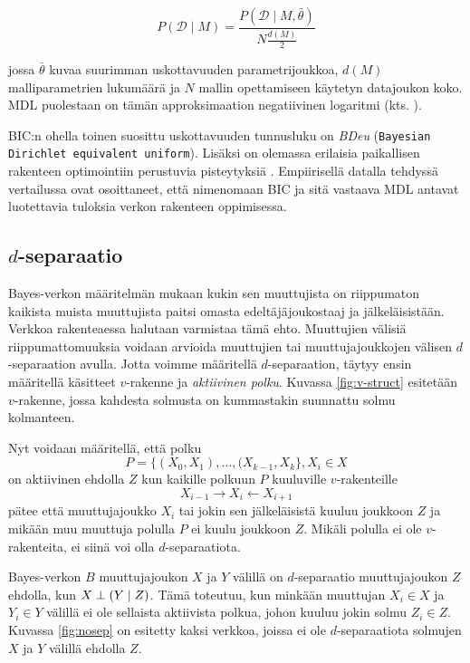$$
P(\mathcal{D} \mid M) = \frac{P(\mathcal{D}\mid M, \bar{\theta})}{N{\frac{d(M)}{2}}}
$$

jossa $\bar{\theta}$ kuvaa suurimman uskottavuuden parametrijoukkoa, $d(M)$ malliparametrien lukumäärä ja $N$ mallin opettamiseen käytetyn datajoukon koko. MDL puolestaan on tämän approksimaation negatiivinen logaritmi (kts. \citet{rissanen_stochastic_1987}).

BIC:n ohella toinen suosittu uskottavuuden tunnusluku on \emph{BDeu} (\texttt{Bayesian Dirichlet equivalent uniform}). Lisäksi on olemassa erilaisia paikallisen rakenteen optimointiin perustuvia pisteytyksiä \citep{scanagatta_survey_2019}.   Empiirisellä datalla tehdyssä vertailussa \citet{liu_empirical_2012} ovat osoittaneet, että nimenomaan BIC ja sitä vastaava MDL antavat luotettavia tuloksia verkon rakenteen oppimisessa.

\subsection{$d$-separaatio}\label{dsep}
Bayes-verkon määritelmän mukaan kukin sen muuttujista on riippumaton kaikista muista muuttujista paitsi omasta edeltäjäjoukostaaj ja jälkeläisistään. Verkkoa rakenteaessa halutaan varmistaa tämä ehto. Muuttujien välisiä riippumattomuuksia voidaan arvioida muuttujien tai muuttujajoukkojen välisen $d$-separaation \citep{koller_probabilistic_2009} avulla. Jotta voimme määritellä $d$-separaation, täytyy ensin määritellä käsitteet $v$-rakenne ja \emph{aktiivinen polku}. Kuvassa \ref{fig:v-struct} esitetään $v$-rakenne, jossa kahdesta solmusta on kummastakin suunnattu solmu kolmanteen.

\begin{center}
\end{center}

Nyt voidaan määritellä, että polku
$$
    P = \{(X_0, X_1), \ldots ,(X_{k-1}, X_k\}, X_i \in X
$$ 
on aktiivinen ehdolla $Z$ kun kaikille polkuun $P$ kuuluville $v$-rakenteille
$$
    X_{i-1} \rightarrow X_i \leftarrow X_{i+1}
$$
pätee että muuttujajoukko $X_i$ tai jokin sen jälkeläisistä kuuluu joukkoon $Z$ ja mikään muu muuttuja polulla $P$ ei kuulu joukkoon $Z$. Mikäli polulla ei ole $v$-rakenteita, ei siinä voi olla $d$-separaatiota.

Bayes-verkon $B$ muuttujajoukon $X$ ja $Y$ välillä on $d$-separaatio muuttujajoukon $Z$ ehdolla, kun $X \perp (Y \mid Z)$. Tämä toteutuu, kun minkään muuttujan $X_i \in X$ ja $Y_i \in Y$ välillä ei ole sellaista aktiivista polkua, johon kuuluu jokin solmu $Z_i \in Z$. Kuvassa \ref{fig:nosep} on esitetty kaksi verkkoa, joissa ei ole $d$-separaatiota solmujen $X$ ja $Y$ välillä ehdolla $Z$.

